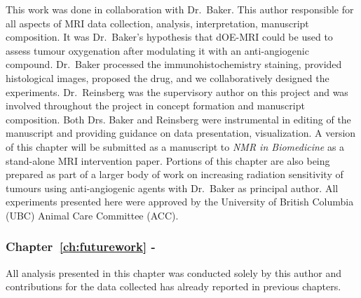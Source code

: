 This work was done in collaboration with Dr.\ Baker.
This author responsible for all aspects of MRI data collection, analysis, interpretation, manuscript composition. 
It was Dr.\ Baker's hypothesis that \acs{dOE-MRI}  could be used to assess tumour oxygenation after modulating it with an anti-angiogenic compound. 
Dr.\ Baker processed the immunohistochemistry staining, provided histological images, proposed the drug, and we collaboratively designed the experiments. 
Dr.\ Reinsberg was the supervisory author on this project and was involved throughout the project in concept formation and manuscript composition. 
Both Drs. Baker and Reinsberg were instrumental in editing of the manuscript and providing guidance on data presentation, visualization.
A version of this chapter will be submitted as a manuscript to \textit{NMR in Biomedicine} as a stand-alone MRI intervention paper.
Portions of this chapter are also being prepared as part of a larger body of work on increasing radiation sensitivity of tumours using anti-angiogenic agents with Dr.\ Baker as principal author.
All experiments presented here were approved by the University of British Columbia (UBC) Animal Care Committee (ACC).

\subsubsection{Chapter~\ref{ch:futurework} - }

All analysis presented in this chapter was conducted solely by this author and contributions for the data collected has already reported in previous chapters.
